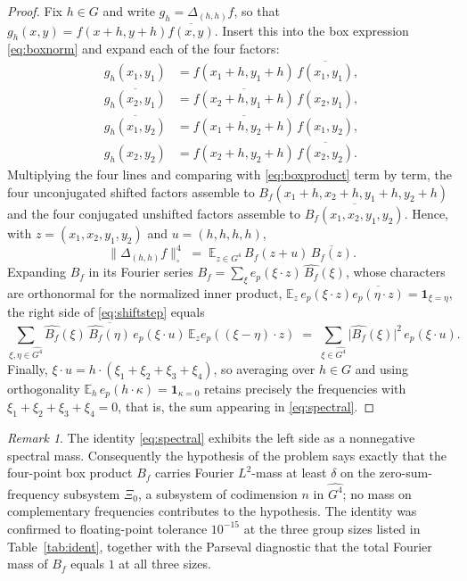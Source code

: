 \documentclass[11pt]{article}
\theoremstyle{remark}
\newtheorem*{remark}{Remark}
\begin{document}
\begin{proof}
Fix $h\in G$ and write $g_h=\Delta_{(h,h)}f$, so that
$g_h(x,y)=f(x+h,y+h)\overline{f(x,y)}$. Insert this into the box expression
\eqref{eq:boxnorm} and expand each of the four factors:
\begin{align*}
g_h(x_1,y_1)&=f(x_1+h,y_1+h)\,\overline{f(x_1,y_1)},\\
\overline{g_h(x_2,y_1)}&=\overline{f(x_2+h,y_1+h)}\,f(x_2,y_1),\\
\overline{g_h(x_1,y_2)}&=\overline{f(x_1+h,y_2+h)}\,f(x_1,y_2),\\
g_h(x_2,y_2)&=f(x_2+h,y_2+h)\,\overline{f(x_2,y_2)}.
\end{align*}
Multiplying the four lines and comparing with \eqref{eq:boxproduct} term by
term, the four unconjugated shifted factors assemble to
$B_f(x_1+h,x_2+h,y_1+h,y_2+h)$ and the four conjugated unshifted factors
assemble to $\overline{B_f(x_1,x_2,y_1,y_2)}$. Hence, with
$z=(x_1,x_2,y_1,y_2)$ and $u=(h,h,h,h)$,
\begin{equation}\label{eq:shiftstep}
\bigl\|\Delta_{(h,h)}f\bigr\|_\square^4
\;=\;\mathbb{E}_{z\in G^4}\,
B_f(z+u)\,\overline{B_f(z)}.
\end{equation}
Expanding $B_f$ in its Fourier series
$B_f=\sum_{\xi}e_p(\xi\cdot z)\,\widehat{B_f}(\xi)$, whose characters are
orthonormal for the normalized inner product,
$\mathbb{E}_z\,e_p(\xi\cdot z)\overline{e_p(\eta\cdot z)}
=\mathbf{1}_{\xi=\eta}$, the right side of \eqref{eq:shiftstep} equals
\[
\sum_{\xi,\eta\in\widehat{G^4}}
\widehat{B_f}(\xi)\,\overline{\widehat{B_f}(\eta)}\,
e_p(\xi\cdot u)\,\mathbb{E}_z e_p((\xi-\eta)\cdot z)
\;=\;
\sum_{\xi\in\widehat{G^4}}\bigl|\widehat{B_f}(\xi)\bigr|^2\,e_p(\xi\cdot u).
\]
Finally, $\xi\cdot u=h\cdot(\xi_1+\xi_2+\xi_3+\xi_4)$, so averaging over
$h\in G$ and using orthogonality
$\mathbb{E}_h\,e_p(h\cdot\kappa)=\mathbf{1}_{\kappa=0}$ retains precisely the
frequencies with $\xi_1+\xi_2+\xi_3+\xi_4=0$, that is, the sum appearing in
\eqref{eq:spectral}.
\end{proof}

\begin{remark}\label{rem:spectral}
The identity \eqref{eq:spectral} exhibits the left side as a nonnegative
spectral mass. Consequently the hypothesis of the problem says exactly that
the four-point box product $B_f$ carries Fourier $L^2$-mass at least
$\delta$ on the zero-sum-frequency subsystem $\Xi_0$, a subsystem of
codimension $n$ in $\widehat{G^4}$; no mass on complementary frequencies
contributes to the hypothesis. The identity was confirmed to floating-point
tolerance $10^{-15}$ at the three group sizes listed in
Table~\ref{tab:ident}, together with the Parseval diagnostic that the total
Fourier mass of $B_f$ equals $1$ at all three sizes.
\end{remark}
\end{document}
